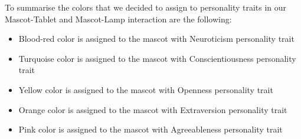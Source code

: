 To summarise the colors that we decided to assign to personality traits in our
Mascot-Tablet and Mascot-Lamp interaction are the following:
\begin{itemize}
\item Blood-red color is assigned to the mascot with Neuroticism personality trait
\item Turquoise color is assigned to the mascot with Conscientiousness personality trait
\item Yellow color is assigned to the mascot with Openness personality trait
\item Orange color is assigned to the mascot with Extraversion personality trait
\item Pink color is assigned to the mascot with Agreeableness personality trait
\end{itemize}